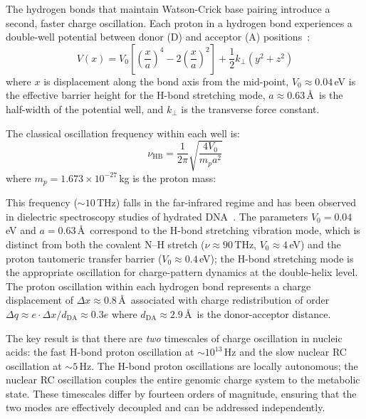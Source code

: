 The hydrogen bonds that maintain Watson-Crick base pairing introduce a second, faster charge oscillation. Each proton in a hydrogen bond experiences a double-well potential between donor (D) and acceptor (A) positions~\cite{Lowdin1963,Limbach2006}:
\begin{equation}
  V(x) = V_0 \left[\left(\frac{x}{a}\right)^4 - 2\left(\frac{x}{a}\right)^2\right] + \frac{1}{2}k_\perp(y^2 + z^2)
  \label{v:eq:double_well}
\end{equation}
where $x$ is displacement along the bond axis from the mid-point, $V_0 \approx 0.04$\,eV is the effective barrier height for the H-bond stretching mode, $a \approx 0.63$\,\AA\ is the half-width of the potential well, and $k_\perp$ is the transverse force constant.

The classical oscillation frequency within each well is:
\begin{equation}
  \nu_{\mathrm{HB}} = \frac{1}{2\pi}\sqrt{\frac{4V_0}{m_p a^2}}
  \label{v:eq:hbond_freq}
\end{equation}
where $m_p = 1.673 \times 10^{-27}$\,kg is the proton mass:

This frequency ($\sim\!10$\,THz) falls in the far-infrared regime and has been observed in dielectric spectroscopy studies of hydrated DNA~\cite{Weidlich1990,Woolard2002}. The parameters $V_0 = 0.04$\,eV and $a = 0.63$\,\AA\ correspond to the H-bond stretching vibration mode, which is distinct from both the covalent N--H stretch ($\nu \approx 90$\,THz, $V_0 \approx 4$\,eV) and the proton tautomeric transfer barrier ($V_0 \approx 0.4$\,eV); the H-bond stretching mode is the appropriate oscillation for charge-pattern dynamics at the double-helix level. The proton oscillation within each hydrogen bond represents a charge displacement of $\Delta x \approx 0.8$\,\AA\ associated with charge redistribution of order $\Delta q \approx e \cdot \Delta x / d_{\mathrm{DA}} \approx 0.3e$ where $d_{\mathrm{DA}} \approx 2.9$\,\AA\ is the donor-acceptor distance.

The key result is that there are \emph{two} timescales of charge oscillation in nucleic acids: the fast H-bond proton oscillation at $\sim\!10^{13}$\,Hz and the slow nuclear RC oscillation at $\sim\!5$\,Hz. The H-bond proton oscillations are locally autonomous; the nuclear RC oscillation couples the entire genomic charge system to the metabolic state. These timescales differ by fourteen orders of magnitude, ensuring that the two modes are effectively decoupled and can be addressed independently.

